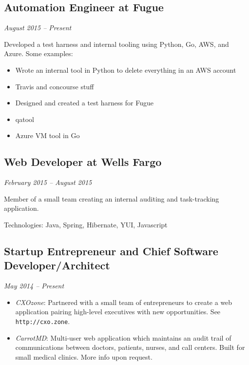 \documentclass[a4paper,11pt]{article}
\begin{document}
\subsection*{Automation Engineer at Fugue}
\vskip -20pt
\hfill \textit{August 2015 -- Present}

Developed a test harness and internal tooling using Python, Go, AWS, and Azure.
Some examples:

\begin{itemize}
\item Wrote an internal tool in Python to delete everything in an AWS account
\item Travis and concourse stuff
\item Designed and created a test harness for Fugue
\item qatool
\item Azure VM tool in Go
\end{itemize}

\subsection*{Web Developer at Wells Fargo}
\vskip -20pt
\hfill \textit{February 2015 -- August 2015}

Member of a small team creating an internal auditing and task-tracking application.

Technologies: Java, Spring, Hibernate, YUI, Javascript

\subsection*{Startup Entrepreneur and Chief Software Developer/Architect}
\vskip -20pt
\hfill \textit{May 2014 -- Present}

\begin{itemize}

  \vskip 5pt
  \item \textit{CXOzone}: Partnered with a small team of entrepreneurs to create a web application
    pairing high-level executives with new opportunities. See \texttt{http://cxo.zone}.

  \item \textit{CarrotMD}: Multi-user web application which maintains an audit trail of
    communications between doctors, patients, nurses, and call centers. Built for small medical
    clinics. More info upon request.

\end{itemize}
\end{document}
